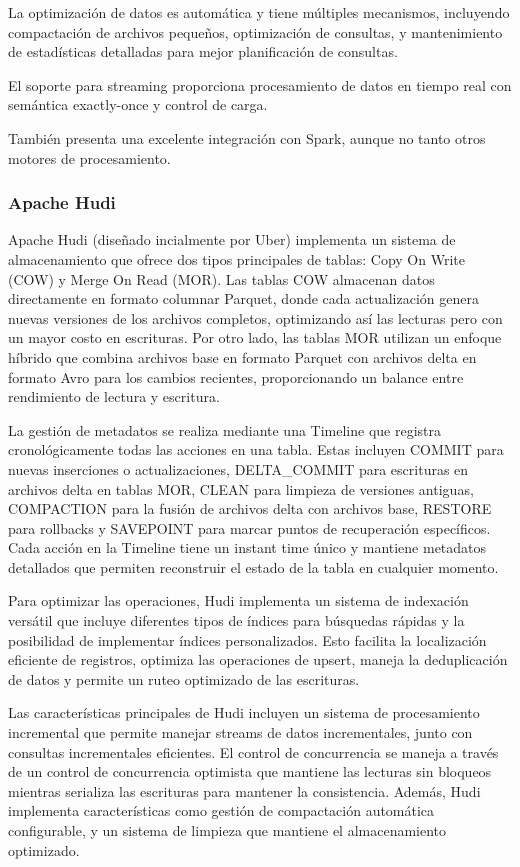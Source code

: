 La optimización de datos es automática y tiene múltiples mecanismos, 
incluyendo compactación de archivos pequeños, optimización de consultas, y mantenimiento de estadísticas detalladas 
para mejor planificación de consultas. 

El soporte para streaming proporciona procesamiento de datos en tiempo real con semántica exactly-once y control de carga.

También presenta una excelente integración con Spark, aunque no tanto otros motores de procesamiento.

\subsubsection{Apache Hudi}

Apache Hudi (diseñado incialmente por Uber) implementa un sistema de almacenamiento que ofrece dos tipos principales de tablas: 
Copy On Write (COW) y Merge On Read (MOR). 
Las tablas COW almacenan datos directamente en formato columnar Parquet, donde cada actualización genera nuevas versiones de los archivos completos, 
optimizando así las lecturas pero con un mayor costo en escrituras.
Por otro lado, las tablas MOR utilizan un enfoque híbrido que combina archivos base en formato Parquet con archivos delta en formato Avro 
para los cambios recientes, proporcionando un balance entre rendimiento de lectura y escritura.

La gestión de metadatos se realiza mediante una Timeline que registra cronológicamente todas las acciones en una tabla. 
Estas incluyen COMMIT para nuevas inserciones o actualizaciones, {DELTA\_COMMIT} para escrituras en archivos delta en tablas MOR, 
CLEAN para limpieza de versiones antiguas, COMPACTION para la fusión de archivos delta con archivos base, RESTORE para rollbacks 
y SAVEPOINT para marcar puntos de recuperación específicos. 
Cada acción en la Timeline tiene un instant time único y mantiene metadatos detallados que permiten reconstruir el estado de la tabla 
en cualquier momento.

Para optimizar las operaciones, Hudi implementa un sistema de indexación versátil que incluye diferentes tipos de índices 
para búsquedas rápidas y la posibilidad de implementar índices personalizados. 
Esto facilita la localización eficiente de registros, optimiza las operaciones de upsert, 
maneja la deduplicación de datos y permite un ruteo optimizado de las escrituras.

Las características principales de Hudi incluyen un sistema de procesamiento incremental que permite manejar streams de datos incrementales, 
junto con consultas incrementales eficientes. 
El control de concurrencia se maneja a través de un control de concurrencia optimista que mantiene las lecturas sin bloqueos mientras 
serializa las escrituras para mantener la consistencia. 
Además, Hudi implementa características como gestión de compactación automática configurable, 
y un sistema de limpieza que mantiene el almacenamiento optimizado.

